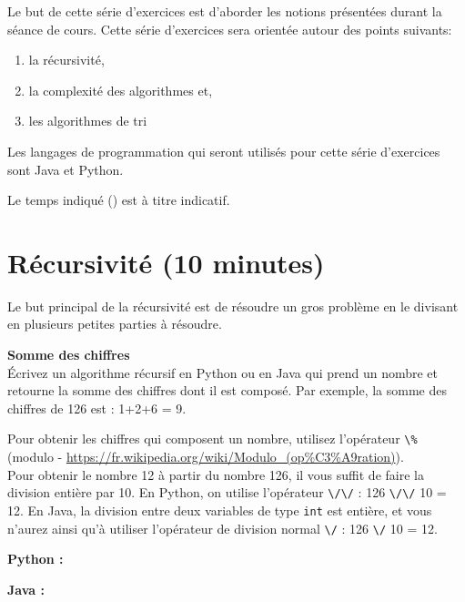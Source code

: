 




\ShowSolutionfalse
\ShowConseiltrue
\titre
{}

Le but de cette série d'exercices est d'aborder les notions présentées durant la séance de cours. Cette série d'exercices sera orientée autour des points suivants:
\begin{enumerate}
    \item la récursivité,
    \item la complexité des algorithmes et,
    \item les algorithmes de tri
\end{enumerate}

Les langages de programmation qui seront utilisés pour cette série d'exercices sont Java et Python.

Le temps indiqué (\faClock) est à titre indicatif.

\section{Récursivité (10 minutes)}

Le but principal de la récursivité est de résoudre un gros problème en le divisant en plusieurs petites parties à résoudre.

\begin{Exercice}[10 minutes] \textbf{Somme des chiffres} \\
    Écrivez un algorithme récursif en Python ou en Java qui prend un nombre et retourne la somme des chiffres dont il est composé. Par exemple, la somme des chiffres de 126 est : 1+2+6 = 9.
    
    \begin{conseil}
    
    Pour obtenir les chiffres qui composent un nombre, utilisez l'opérateur \lstinline{\%} (modulo - \url{https://fr.wikipedia.org/wiki/Modulo\_(op\%C3\%A9ration)}). \\
    Pour obtenir le nombre 12 à partir du nombre 126, il vous suffit de faire la division entière par 10. En Python, on utilise l'opérateur \lstinline{\/\/} : 126 \lstinline{\/\/} 10 = 12. En Java, la division entre deux variables de type \lstinline{int} est entière, et vous n'aurez ainsi qu'à utiliser l'opérateur de division normal \lstinline{\/} : 126 \lstinline{\/} 10 = 12.
    
    \end{conseil}
    
    \begin{solution}
    \textbf{Python :}
        
                
    \textbf{Java :}
       
    
    \end{solution}
\end{Exercice}

